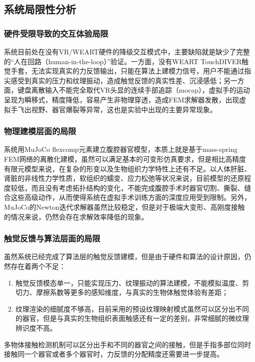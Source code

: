 \subsection{系统局限性分析}

\subsubsection{硬件受限导致的交互体验局限}
系统目前处在没有VR/WEART硬件的降级交互模式中，主要缺陷就是缺少了完整的“人在回路（human-in-the-loop）”验证。一方面，没有WEART TouchDIVER触觉手套，无法实现真实的力反馈输出，只能在算法上建模力信号，用户不能通过指尖感受到真实的压力和纹理振动，造成触觉反馈的真实性差、沉浸感低；另一方面，键盘离散输入不能完全取代VR头显的连续手部追踪（mocap），虚拟手的运动呈现为瞬移式，精度降低，容易产生非物理穿透，造成FEM求解器发散，出现虚拟手飞出视野、器官爆裂等异常，这也是实验中出现的主要异常现象。

\subsubsection{物理建模层面的局限}
系统用MuJoCo flexcomp元素建立腹腔器官模型，本质上就是基于mass-spring FEM网络的离散化建模，虽然可以满足基本的可变形仿真要求，但是相比高精度有限元模型来说，在复杂的形变以及生物组织力学特性上还有不足。以人体肝脏、肾脏的非线性力学性质，软组织的蠕变、应力松弛等状况来说，目前模型的还原程度较低，而且没有考虑拓扑结构的变化，不能完成腹腔手术时器官切割、撕裂、缝合这些高级动作，从而使得系统在虚拟手术训练方面的深度应用受到限制。另外，MuJoCo的Newton迭代求解器虽然比较稳定，但是对于极端大变形、高刚度接触的情况来说，仍然会存在求解效率降低的现象。

\subsubsection{触觉反馈与算法层面的局限}
虽然系统已经完成了算法层的触觉反馈建模，但是由于硬件和算法的设计原因，仍然存在着两个不足：
\begin{enumerate}
    \item 触觉反馈模态单一，只能实现压力、纹理振动的算法建模，不能模拟温度、剪切力、摩擦系数等更多的感知维度，与真实的生物体触觉体验有差距；
    \item 纹理渲染的细腻度不够高，目前采用的预设纹理映射模式虽然可以区分出不同的器官，但是与真实的生物组织表面触感还有一定的差别，非常细腻的微纹理辨识度不高。
\end{enumerate}
多物体接触检测机制可以区分出手和不同的器官之间的接触，但是手指多部位同时接触同一个器官或者多个器官时，力反馈的分配精度还需要进一步提高。

